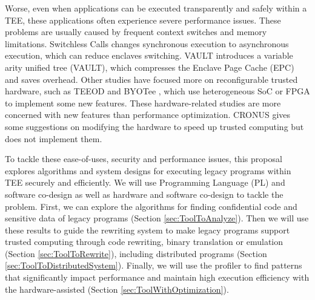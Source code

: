 Worse, even when applications can be executed transparently and safely within a TEE,
these applications often experience severe performance issues.
These problems are usually caused by frequent context switches and memory limitations.
Switchless Calls \cite{Tian2018SwitchlessCM} changes synchronous execution
to asynchronous execution, which can reduce enclaves switching.
VAULT \cite{Taassori2018VAULTRP} introduces a variable arity unified tree (VAULT),
which compresses the Enclave Page Cache (EPC) and saves overhead.
Other studies have focused more on reconfigurable trusted hardware,
such as TEEOD \cite{Pereira2021TowardsAT} and BYOTee \cite{Armanuzzaman2022BYOTeeTB},
which use heterogeneous SoC or FPGA to implement some new features.
These hardware-related studies are more concerned with new features than
performance optimization. CRONUS \cite{Jiang2022CRONUSFS} gives some suggestions
on modifying the hardware to speed up trusted computing but does not
implement them.

To tackle these ease-of-uses, security and performance issues, this proposal explores
algorithms and system designs for executing legacy programs within TEE securely and efficiently.
We will use Programming Language (PL) and software co-design as well as hardware and software co-design
to tackle the problem.
First, we can explore the algorithms for finding confidential code and sensitive data of
legacy programs (Section \ref{sec:ToolToAnalyze}). Then we will use these results
to guide the rewriting system to make legacy programs support trusted computing through
code rewriting, binary translation or emulation (Section \ref{sec:ToolToRewrite}),
including distributed programs (Section \ref{sec:ToolToDistributedSystem}).
Finally, we will use the profiler to find patterns that significantly impact
performance and maintain high execution efficiency with the hardware-assisted
(Section \ref{sec:ToolWithOptimization}).
